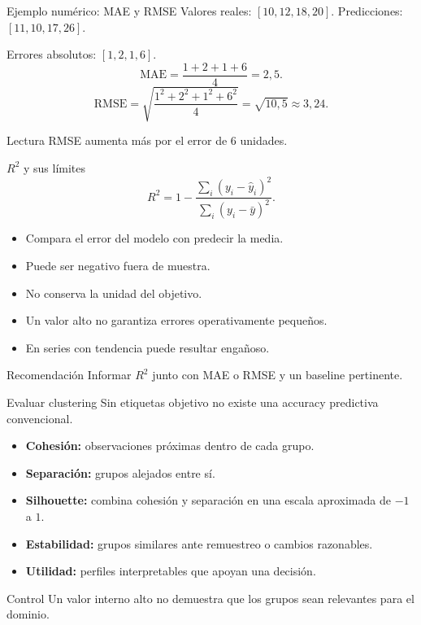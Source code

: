 \documentclass[aspectratio=169,10pt]{beamer}
\newcommand{\concepto}[1]{\textcolor{UAPTeal}{\textbf{#1}}}
\begin{document}
\begin{frame}{Ejemplo numérico: MAE y RMSE}
  \small
  Valores reales: $[10,12,18,20]$. Predicciones: $[11,10,17,26]$.

  Errores absolutos: $[1,2,1,6]$.
  \[
    \mathrm{MAE}=\frac{1+2+1+6}{4}=2{,}5.
  \]
  \[
    \mathrm{RMSE}=\sqrt{\frac{1^2+2^2+1^2+6^2}{4}}
    =\sqrt{10{,}5}\approx3{,}24.
  \]
  \begin{block}{Lectura}
    RMSE aumenta más por el error de 6 unidades.
  \end{block}
\end{frame}

\begin{frame}{$R^2$ y sus límites}
  \small
  \[
    R^2=1-\frac{\sum_i(y_i-\widehat y_i)^2}{\sum_i(y_i-\bar y)^2}.
  \]
  \begin{itemize}
    \item Compara el error del modelo con predecir la media.
    \item Puede ser negativo fuera de muestra.
    \item No conserva la unidad del objetivo.
    \item Un valor alto no garantiza errores operativamente pequeños.
    \item En series con tendencia puede resultar engañoso.
  \end{itemize}
  \begin{block}{Recomendación}
    Informar $R^2$ junto con MAE o RMSE y un baseline pertinente.
  \end{block}
\end{frame}

\begin{frame}{Evaluar clustering}
  \small
  Sin etiquetas objetivo no existe una accuracy predictiva convencional.
  \begin{itemize}
    \item \concepto{Cohesión:} observaciones próximas dentro de cada grupo.
    \item \concepto{Separación:} grupos alejados entre sí.
    \item \concepto{Silhouette:} combina cohesión y separación en una escala aproximada de $-1$ a $1$.
    \item \concepto{Estabilidad:} grupos similares ante remuestreo o cambios razonables.
    \item \concepto{Utilidad:} perfiles interpretables que apoyan una decisión.
  \end{itemize}
  \begin{alertblock}{Control}
    Un valor interno alto no demuestra que los grupos sean relevantes para el dominio.
  \end{alertblock}
\end{frame}
\end{document}
